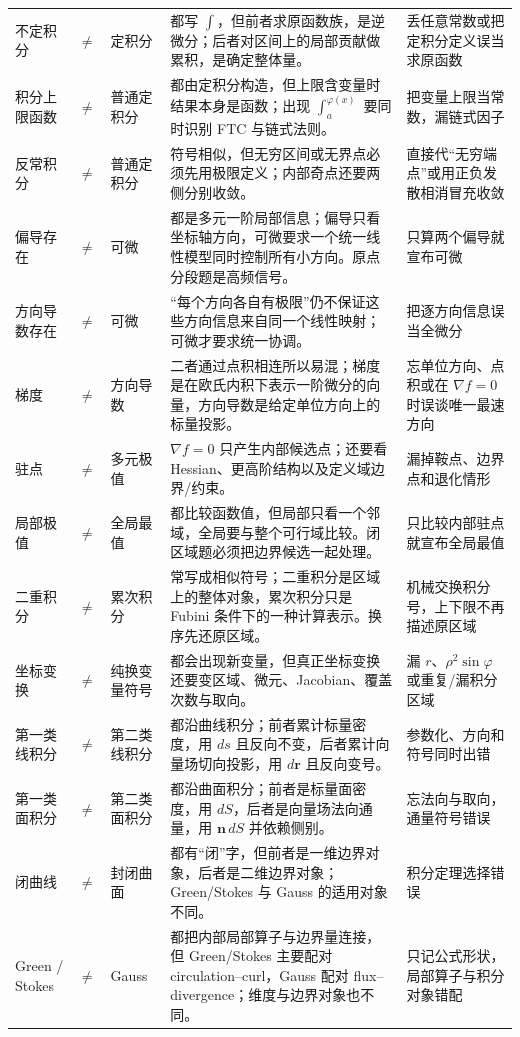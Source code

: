 \documentclass[11pt,a4paper,openany]{ctexbook}
\begin{document}
\begin{longtable}{L{1.8cm}@{}>{\centering\arraybackslash}p{0.35cm}@{}L{1.8cm}L{5.4cm}L{\dimexpr\linewidth-9.72cm\relax}}
不定积分 & $\neq$ & 定积分 & 都写 $\int$，但前者求原函数族，是逆微分；后者对区间上的局部贡献做累积，是确定整体量。 & 丢任意常数或把定积分定义误当求原函数\\
积分上限函数 & $\neq$ & 普通定积分 & 都由定积分构造，但上限含变量时结果本身是函数；出现 $\int_a^{\varphi(x)}$ 要同时识别 FTC 与链式法则。 & 把变量上限当常数，漏链式因子\\
反常积分 & $\neq$ & 普通定积分 & 符号相似，但无穷区间或无界点必须先用极限定义；内部奇点还要两侧分别收敛。 & 直接代“无穷端点”或用正负发散相消冒充收敛\\
偏导存在 & $\neq$ & 可微 & 都是多元一阶局部信息；偏导只看坐标轴方向，可微要求一个统一线性模型同时控制所有小方向。原点分段题是高频信号。 & 只算两个偏导就宣布可微\\
方向导数存在 & $\neq$ & 可微 & “每个方向各自有极限”仍不保证这些方向信息来自同一个线性映射；可微才要求统一协调。 & 把逐方向信息误当全微分\\
梯度 & $\neq$ & 方向导数 & 二者通过点积相连所以易混；梯度是在欧氏内积下表示一阶微分的向量，方向导数是给定单位方向上的标量投影。 & 忘单位方向、点积或在 $\nabla f=0$ 时误谈唯一最速方向\\
驻点 & $\neq$ & 多元极值 & $\nabla f=0$ 只产生内部候选点；还要看 Hessian、更高阶结构以及定义域边界/约束。 & 漏掉鞍点、边界点和退化情形\\
局部极值 & $\neq$ & 全局最值 & 都比较函数值，但局部只看一个邻域，全局要与整个可行域比较。闭区域题必须把边界候选一起处理。 & 只比较内部驻点就宣布全局最值\\
二重积分 & $\neq$ & 累次积分 & 常写成相似符号；二重积分是区域上的整体对象，累次积分只是 Fubini 条件下的一种计算表示。换序先还原区域。 & 机械交换积分号，上下限不再描述原区域\\
坐标变换 & $\neq$ & 纯换变量符号 & 都会出现新变量，但真正坐标变换还要变区域、微元、Jacobian、覆盖次数与取向。 & 漏 $r$、$\rho^2\sin\varphi$ 或重复/漏积分区域\\
第一类线积分 & $\neq$ & 第二类线积分 & 都沿曲线积分；前者累计标量密度，用 $ds$ 且反向不变，后者累计向量场切向投影，用 $d\bm r$ 且反向变号。 & 参数化、方向和符号同时出错\\
第一类面积分 & $\neq$ & 第二类面积分 & 都沿曲面积分；前者是标量面密度，用 $dS$，后者是向量场法向通量，用 $\bm n\,dS$ 并依赖侧别。 & 忘法向与取向，通量符号错误\\
闭曲线 & $\neq$ & 封闭曲面 & 都有“闭”字，但前者是一维边界对象，后者是二维边界对象；Green/Stokes 与 Gauss 的适用对象不同。 & 积分定理选择错误\\
Green / Stokes & $\neq$ & Gauss & 都把内部局部算子与边界量连接，但 Green/Stokes 主要配对 circulation--curl，Gauss 配对 flux--divergence；维度与边界对象也不同。 & 只记公式形状，局部算子与积分对象错配\\

\end{longtable}
\end{document}

